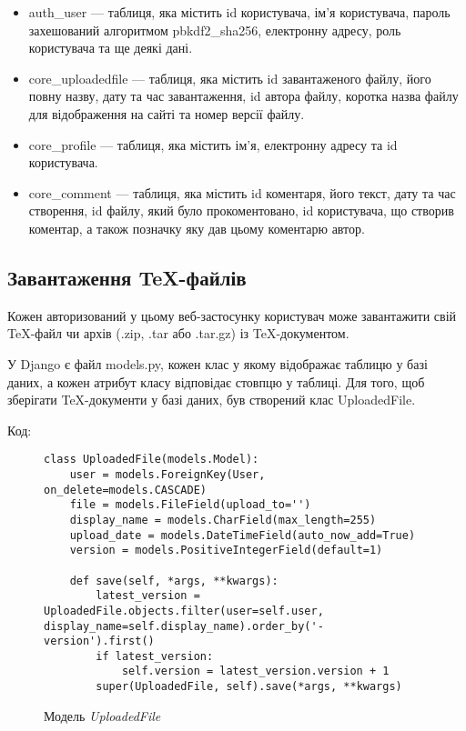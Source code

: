 \documentclass[a4paper,14pt]{extarticle}
\numberwithin{figure}{section}
\begin{document}
    \begin{itemize}
    \item auth\_user --- таблиця, яка містить id користувача, ім'я користувача, пароль захешований алгоритмом pbkdf2\_sha256, електронну адресу, роль користувача та ще деякі дані.

    \item core\_uploadedfile --- таблиця, яка містить id завантаженого файлу, його повну назву, дату та час завантаження, id автора файлу, коротка назва файлу для відображення на сайті та номер версії файлу.

    \item core\_profile --- таблиця, яка містить ім'я, електронну адресу та id користувача.

    \item core\_comment --- таблиця, яка містить id коментаря, його текст, дату та час створення, id файлу, який було прокоментовано, id користувача, що створив коментар, а також позначку яку дав цьому коментарю автор.
   
    \end{itemize}
    
    \newpage
    \subsection{\large Завантаження TeX-файлів}

    Кожен авторизований у цьому веб-застосунку користувач може завантажити свій TeX-файл чи архів (.zip, .tar або .tar.gz) із TeX-документом. 

    У Django є файл models.py, кожен клас у якому відображає таблицю у базі даних, а кожен атрибут класу відповідає стовпцю у таблиці. Для того, щоб зберігати TeX-документи у базі даних, був створений клас UploadedFile.

    Код:
    \begin{figure}[h]
    \centering
    \begin{lstlisting}[style=mystyle]
class UploadedFile(models.Model):
    user = models.ForeignKey(User, on_delete=models.CASCADE)
    file = models.FileField(upload_to='')
    display_name = models.CharField(max_length=255)
    upload_date = models.DateTimeField(auto_now_add=True)
    version = models.PositiveIntegerField(default=1)

    def save(self, *args, **kwargs):
        latest_version = UploadedFile.objects.filter(user=self.user, display_name=self.display_name).order_by('-version').first()
        if latest_version:
            self.version = latest_version.version + 1
        super(UploadedFile, self).save(*args, **kwargs)
    \end{lstlisting}
    \caption{\normalsize Модель \textit{UploadedFile}}
    \end{figure}
\end{document}
